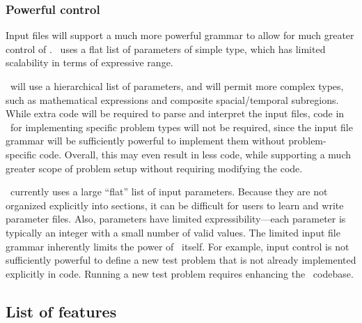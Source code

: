 \documentclass[11pt]{article}
\begin{document}
    \subsubsection{Powerful control}  

    Input files will support a much more powerful grammar to allow for
    much greater control of \cello.  \enzo\ uses a flat list of
    parameters of simple type, which has limited scalability in terms
    of expressive range.

    \cello\ will use a hierarchical list of parameters, and will
    permit more complex types, such as mathematical expressions and
    composite spacial/temporal subregions.  While extra code will be
    required to parse and interpret the input files, code in \enzo\
    for implementing specific problem types will not be required, since
    the input file grammar will be sufficiently powerful to
    implement them without problem-specific code.  Overall, this may
    even result in less code, while supporting a much greater
    scope of problem setup without requiring modifying the code.
    


% 
    \enzo\ currently uses a large ``flat'' list of input parameters.
    Because they are not organized explicitly into sections, it can be
    difficult for users to learn and write parameter files.
%
    Also, parameters have limited expressibility---each parameter is
    typically an integer with a small number of valid values.
%
    The limited input file grammar inherently limits the power of
    \enzo\ itself.  For example, input control is not sufficiently
    powerful to define a new test problem that is not already
    implemented explicitly in code.  Running a new test problem
    requires enhancing the \enzo\ codebase.


\subsection{List of features}
\end{document}
